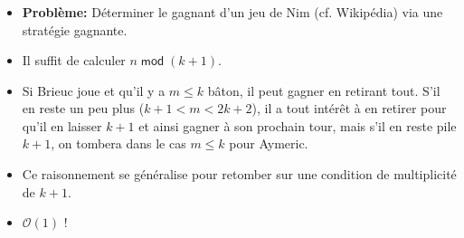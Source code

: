 \begin{frame}
    \frametitle{\problemtitle}
    \begin{itemize}
        \item<+-> \textbf{Problème:} Déterminer le gagnant d'un jeu de Nim (cf. Wikipédia) via une stratégie gagnante.
        \item<+-> Il suffit de calculer $n\;\mathsf{mod}\; (k + 1)$.
        \item<+-> Si Brieuc joue et qu'il y a $m \le k$ bâton, il peut gagner en retirant tout. S'il en reste un peu plus ($k+1<m<2k+2$), il a tout intérêt à en retirer pour qu'il en laisser $k+1$ et ainsi gagner à son prochain tour, mais s'il en reste pile $k+1$, on tombera dans le cas $m\le k$ pour Aymeric.
        \item<+-> Ce raisonnement se généralise pour retomber sur une condition de multiplicité de $k+1$.
        \item<+-> $\mathcal O(1)$ !
    \end{itemize}
    \solvestats
\end{frame}
